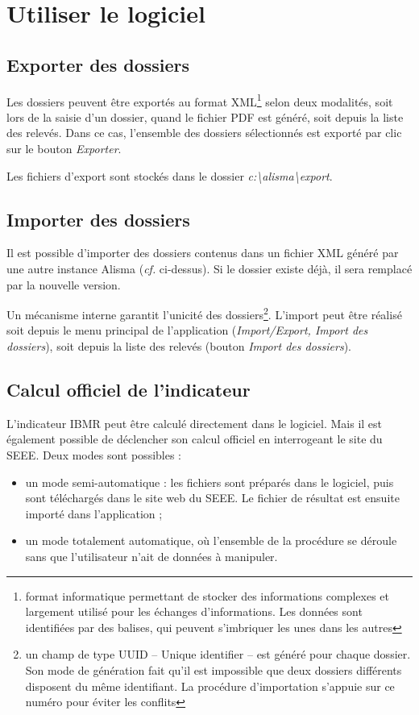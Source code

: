 \chapter{Utiliser le logiciel}

\section{Exporter des dossiers}

Les dossiers peuvent être exportés au format XML\footnote{format informatique permettant de stocker des informations complexes et largement utilisé pour les échanges d'informations. Les données sont identifiées par des balises, qui peuvent s'imbriquer les unes dans les autres} selon deux modalités, soit lors de la saisie d'un dossier, quand le fichier PDF est généré, 
soit depuis la liste des relevés. Dans ce cas, l'ensemble des dossiers sélectionnés est exporté par clic sur le bouton \textit{Exporter}.

Les fichiers d'export sont stockés dans le dossier \textit{\NoAutoSpaceBeforeFDP c:\textbackslash{}alisma\textbackslash{}export}.

\section{Importer des dossiers}

Il est possible d'importer des dossiers contenus dans un fichier XML généré par une autre instance Alisma (\textit{cf.} ci-dessus). Si le dossier existe déjà, il sera remplacé par la nouvelle version.

Un mécanisme interne garantit l'unicité des dossiers\footnote{un champ de type UUID -- Unique identifier -- est généré pour chaque dossier. Son mode de génération fait qu'il est impossible que deux dossiers différents disposent du même identifiant. La procédure d'importation s'appuie sur ce numéro pour éviter les conflits}. L'import peut être réalisé soit depuis le menu principal de l'application (\textit{Import/Export, Import des dossiers}), soit depuis la liste des relevés (bouton \textit{Import des dossiers}).

\section{Calcul officiel de l'indicateur}

L'indicateur IBMR peut être calculé directement dans le logiciel. Mais il est également possible de déclencher son calcul officiel en interrogeant le site du SEEE. Deux modes sont possibles :
\begin{itemize}
\item un mode semi-automatique : les fichiers sont préparés dans le logiciel, puis sont téléchargés dans le site web du SEEE. Le fichier de résultat est ensuite importé dans l'application ;
\item un mode totalement automatique, où l'ensemble de la procédure se déroule sans que l'utilisateur n'ait de données à manipuler.
\end{itemize}

